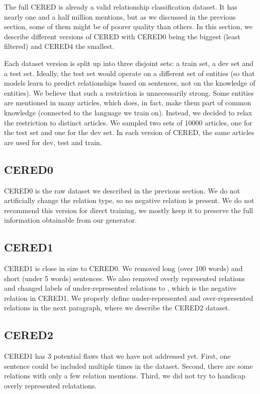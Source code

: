 The full CERED is already a valid relationship classification dataset. It has nearly one and a half million mentions, but as we discussed in the previous section, some of them might be of poorer quality than others. In this section, we describe different versions of CERED with CERED0 being the biggest (least filtered) and CERED4 the smallest. 


Each dataset version is split up into three disjoint sets: a train set, a dev set and a test set. Ideally, the test set would operate on a different set of entities (so that models learn to predict relationships based on sentences, not on the knowledge of entities). We believe that such a restriction is unnecessarily strong. Some entities are mentioned in many articles, which does, in fact, make them part of common knowledge (connected to the language we train on). Instead, we decided to relax the restriction to distinct articles. We sampled two sets of \num{10000} articles, one for the test set and one for the dev set. In each version of CERED, the same articles are used for dev, test and train.

\subsection{CERED0}
CERED0 is the raw dataset we described in the previous section. We do not artificially change the relation type, so no negative relation is present. We do not recommend this version for direct training, we mostly keep it to preserve the full information obtainable from our generator.

\subsection{CERED1}
CERED1 is close in size to CERED0. We removed long (over 100 words) and short (under 5 words) sentences. We also removed overly represented relations and changed labels of under-represented relations to , which is the negative relation in CERED1. We properly define under-represented and over-represented relations in the next paragraph, where we describe the CERED2 dataset.

\subsection{CERED2}

CERED1 has 3 potential flaws that we have not addressed yet. First, one sentence could be included multiple times in the dataset. Second, there are some relations with only a few relation mentions. Third, we did not try to handicap overly represented relatations. 

